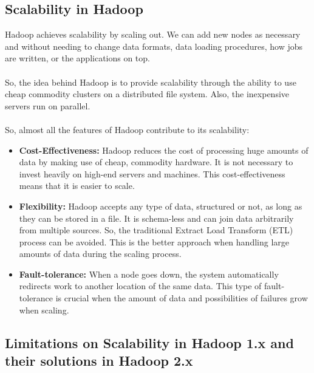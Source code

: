 \documentclass[a4paper,12pt,oneside]{report}
\begin{document}
\subsection{Scalability in Hadoop}

Hadoop achieves scalability by scaling out. We can add new nodes as necessary and without needing to change data formats, data loading procedures, how jobs are written, or the applications on top.\\
\\
So, the idea behind Hadoop is to provide scalability through the ability to use cheap commodity clusters on a distributed file system. 
Also, the inexpensive servers run on parallel.\\ 
\\
So, almost all the features of Hadoop contribute to its scalability:

\begin{itemize}

        \item \textbf{Cost-Effectiveness:} Hadoop reduces the cost of processing huge amounts of data by making use of cheap, commodity hardware. 
                It is not necessary to invest heavily on high-end servers and machines. 
                This cost-effectiveness means that it is easier to scale.

        \item \textbf{Flexibility:} Hadoop accepts any type of data, structured or not, as long as they can be stored in a file. 
                It is schema-less and can join data arbitrarily from multiple sources. 
                So, the traditional Extract Load Transform (ETL) process can be avoided. 
                This is the better approach when handling large amounts of data during the scaling process.

        \item \textbf{Fault-tolerance:} When a node goes down, the system automatically redirects work to another location of the same data. 
                This type of fault-tolerance is crucial when the amount of data and possibilities of failures grow when scaling.

\end{itemize}

\subsection{Limitations on Scalability in Hadoop 1.x and their solutions in Hadoop 2.x}
\end{document}
